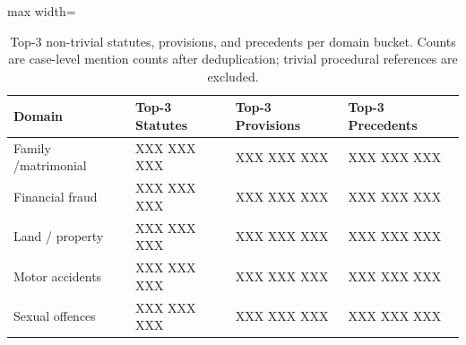 \documentclass[runningheads]{llncs}
\begin{document}
\begin{table}[!htbp]
\centering
\caption{Top-3 non-trivial statutes, provisions, and precedents per domain bucket. Counts are case-level mention counts after deduplication; trivial procedural references are excluded.}
\label{tab:top3-entities}
\setlength{\tabcolsep}{4pt}
\renewcommand{\arraystretch}{1.05}
\scriptsize
\begin{adjustbox}{max width=\textwidth}
\begin{tabular}{p{2.0cm} p{3.6cm} p{3.6cm} p{3.6cm}}
\toprule
Domain & Top-3 Statutes & Top-3 Provisions & Top-3 Precedents \\
\midrule
Family /\newline matrimonial
 & XXX \newline XXX \newline XXX
 & XXX \newline XXX \newline XXX
 & XXX \newline XXX \newline XXX \\
\midrule
Financial fraud
 & XXX \newline XXX \newline XXX
 & XXX \newline XXX \newline XXX
 & XXX \newline XXX \newline XXX \\
\midrule
Land / property
 & XXX \newline XXX \newline XXX
 & XXX \newline XXX \newline XXX
 & XXX \newline XXX \newline XXX \\
\midrule
Motor accidents
 & XXX \newline XXX \newline XXX
 & XXX \newline XXX \newline XXX
 & XXX \newline XXX \newline XXX \\
\midrule
Sexual offences
 & XXX \newline XXX \newline XXX
 & XXX \newline XXX \newline XXX
 & XXX \newline XXX \newline XXX \\
\bottomrule
\end{tabular}
\end{adjustbox}
\end{table}
\end{document}
